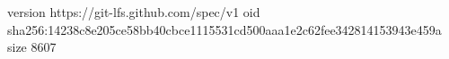 version https://git-lfs.github.com/spec/v1
oid sha256:14238c8e205ce58bb40cbce1115531cd500aaa1e2c62fee342814153943e459a
size 8607
